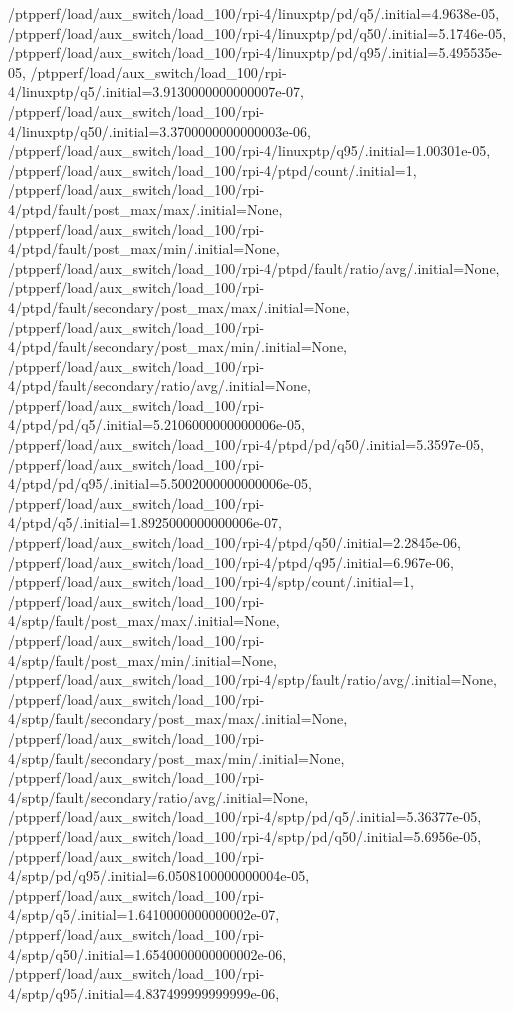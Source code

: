 {    /ptpperf/load/aux_switch/load_100/rpi-4/linuxptp/pd/q5/.initial=4.9638e-05,
    /ptpperf/load/aux_switch/load_100/rpi-4/linuxptp/pd/q50/.initial=5.1746e-05,
    /ptpperf/load/aux_switch/load_100/rpi-4/linuxptp/pd/q95/.initial=5.495535e-05,
    /ptpperf/load/aux_switch/load_100/rpi-4/linuxptp/q5/.initial=3.9130000000000007e-07,
    /ptpperf/load/aux_switch/load_100/rpi-4/linuxptp/q50/.initial=3.3700000000000003e-06,
    /ptpperf/load/aux_switch/load_100/rpi-4/linuxptp/q95/.initial=1.00301e-05,
    /ptpperf/load/aux_switch/load_100/rpi-4/ptpd/count/.initial=1,
    /ptpperf/load/aux_switch/load_100/rpi-4/ptpd/fault/post_max/max/.initial=None,
    /ptpperf/load/aux_switch/load_100/rpi-4/ptpd/fault/post_max/min/.initial=None,
    /ptpperf/load/aux_switch/load_100/rpi-4/ptpd/fault/ratio/avg/.initial=None,
    /ptpperf/load/aux_switch/load_100/rpi-4/ptpd/fault/secondary/post_max/max/.initial=None,
    /ptpperf/load/aux_switch/load_100/rpi-4/ptpd/fault/secondary/post_max/min/.initial=None,
    /ptpperf/load/aux_switch/load_100/rpi-4/ptpd/fault/secondary/ratio/avg/.initial=None,
    /ptpperf/load/aux_switch/load_100/rpi-4/ptpd/pd/q5/.initial=5.2106000000000006e-05,
    /ptpperf/load/aux_switch/load_100/rpi-4/ptpd/pd/q50/.initial=5.3597e-05,
    /ptpperf/load/aux_switch/load_100/rpi-4/ptpd/pd/q95/.initial=5.5002000000000006e-05,
    /ptpperf/load/aux_switch/load_100/rpi-4/ptpd/q5/.initial=1.8925000000000006e-07,
    /ptpperf/load/aux_switch/load_100/rpi-4/ptpd/q50/.initial=2.2845e-06,
    /ptpperf/load/aux_switch/load_100/rpi-4/ptpd/q95/.initial=6.967e-06,
    /ptpperf/load/aux_switch/load_100/rpi-4/sptp/count/.initial=1,
    /ptpperf/load/aux_switch/load_100/rpi-4/sptp/fault/post_max/max/.initial=None,
    /ptpperf/load/aux_switch/load_100/rpi-4/sptp/fault/post_max/min/.initial=None,
    /ptpperf/load/aux_switch/load_100/rpi-4/sptp/fault/ratio/avg/.initial=None,
    /ptpperf/load/aux_switch/load_100/rpi-4/sptp/fault/secondary/post_max/max/.initial=None,
    /ptpperf/load/aux_switch/load_100/rpi-4/sptp/fault/secondary/post_max/min/.initial=None,
    /ptpperf/load/aux_switch/load_100/rpi-4/sptp/fault/secondary/ratio/avg/.initial=None,
    /ptpperf/load/aux_switch/load_100/rpi-4/sptp/pd/q5/.initial=5.36377e-05,
    /ptpperf/load/aux_switch/load_100/rpi-4/sptp/pd/q50/.initial=5.6956e-05,
    /ptpperf/load/aux_switch/load_100/rpi-4/sptp/pd/q95/.initial=6.0508100000000004e-05,
    /ptpperf/load/aux_switch/load_100/rpi-4/sptp/q5/.initial=1.6410000000000002e-07,
    /ptpperf/load/aux_switch/load_100/rpi-4/sptp/q50/.initial=1.6540000000000002e-06,
    /ptpperf/load/aux_switch/load_100/rpi-4/sptp/q95/.initial=4.837499999999999e-06,
}
